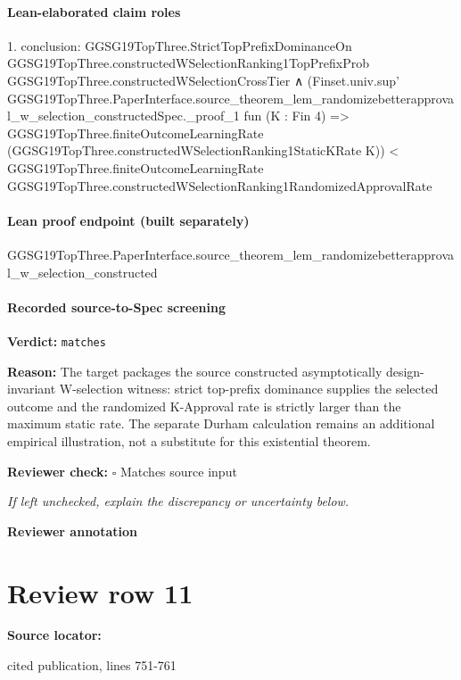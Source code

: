 \documentclass[10pt]{article}
\newcommand{\reviewerbox}{%
  \par\noindent\fbox{\parbox{0.96\linewidth}{\rule{0pt}{0.38in}}}\par
}
\newcommand{\reviewmatch}[1]{%
  \par\noindent\textbf{Reviewer check:} $\square$\; #1\par
  \noindent\emph{If left unchecked, explain the discrepancy or uncertainty below.}\par
}
\begin{document}
\paragraph{Lean-elaborated claim roles}\begin{ReviewVerbatim}
1. conclusion: GGSG19TopThree.StrictTopPrefixDominanceOn GGSG19TopThree.constructedWSelectionRanking1TopPrefixProb
    GGSG19TopThree.constructedWSelectionCrossTier ∧
  (Finset.univ.sup'
      GGSG19TopThree.PaperInterface.source_theorem_lem_randomizebetterapproval_w_selection_constructedSpec._proof_1
      fun (K : Fin 4) =>
      GGSG19TopThree.finiteOutcomeLearningRate (GGSG19TopThree.constructedWSelectionRanking1StaticKRate K)) <
    GGSG19TopThree.finiteOutcomeLearningRate GGSG19TopThree.constructedWSelectionRanking1RandomizedApprovalRate
\end{ReviewVerbatim}

\paragraph{Lean proof endpoint (built separately)}\begin{ReviewVerbatim}
GGSG19TopThree.PaperInterface.source_theorem_lem_randomizebetterapproval_w_selection_constructed
\end{ReviewVerbatim}

\paragraph{Recorded source-to-Spec screening}
\textbf{Verdict:} \texttt{matches}
\\
{\raggedright
\textbf{Reason:} The target packages the source constructed asymptotically design-\allowbreak{}invariant W-\allowbreak{}selection witness:\allowbreak{} strict top-\allowbreak{}prefix dominance supplies the selected outcome and the randomized K-\allowbreak{}Approval rate is strictly larger than the maximum static rate.\allowbreak{} The separate Durham calculation remains an additional empirical illustration, not a substitute for this existential theorem.\allowbreak{}
\par}
\reviewmatch{Matches source input}
\noindent\textbf{Reviewer annotation}\par
\reviewerbox
\clearpage
\hypertarget{source-claim-96dd41305a1cb5af}{}
\section*{Review row 11}
\textbf{Source locator:} {\footnotesize\raggedright cited publication, lines 751-\allowbreak{}761\par}
\end{document}
